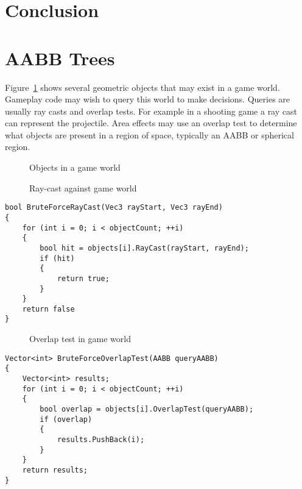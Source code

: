 \documentclass{article}
\begin{document}
\section{Conclusion}


\section{AABB Trees}
Figure~\ref{fig:loose} shows several geometric objects that may exist in a game world. Gameplay code may wish to query this world to make decisions. Queries are usually ray casts and overlap tests. For example in a shooting game a ray cast can represent the projectile. Area effects may use an overlap test to determine what objects are present in a region of space, typically an AABB or spherical region.

\begin{figure}
	\begin{center}
		
	\end{center}
	\caption{Objects in a game world}
	\label{fig:loose}
\end{figure}

\begin{figure}
	\begin{center}
		
	\end{center}
	\caption{Ray-cast against game world}
	\label{fig:raycast}
\end{figure}

\begin{lstlisting}[caption={Brute-force ray-casting}, label={lst:brute_ray}, float]
bool BruteForceRayCast(Vec3 rayStart, Vec3 rayEnd)
{
	for (int i = 0; i < objectCount; ++i)
	{
		bool hit = objects[i].RayCast(rayStart, rayEnd);
		if (hit)
		{
			return true;
		}
	}
	return false
}
\end{lstlisting}

\begin{figure}
	\begin{center}
		
	\end{center}
	\caption{Overlap test in game world}
	\label{fig:overlap}
\end{figure}

\begin{lstlisting}[caption={Brute-force overlap test}, label={lst:brute_overlap}, float]
Vector<int> BruteForceOverlapTest(AABB queryAABB)
{
	Vector<int> results;
	for (int i = 0; i < objectCount; ++i)
	{
		bool overlap = objects[i].OverlapTest(queryAABB);
		if (overlap)
		{
			results.PushBack(i);
		}
	}
	return results;
}
\end{lstlisting}
\end{document}
